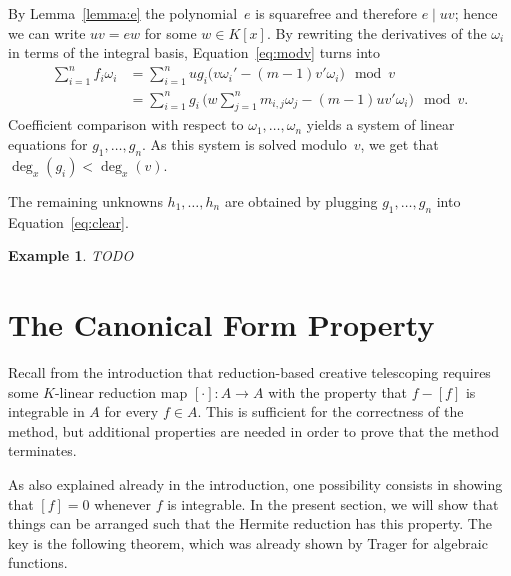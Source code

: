 \documentclass{sig-alternate}
\newtheorem{example}[theorem]{Example}
\begin{document}
By Lemma~\ref{lemma:e} the polynomial~$e$ is squarefree and therefore $e\mid uv$;
hence we can write $uv=ew$ for some $w\in K[x]$. By rewriting the
derivatives of the $\omega_i$ in terms of the integral basis,
Equation~\eqref{eq:modv} turns into
\begin{align*}
  \sum_{i=1}^n f_i\omega_i
  &= \sum_{i=1}^n ug_i \bigl( v\omega_i' - (m-1)v'\omega_i \bigr) \mod v\\
  &= \sum_{i=1}^n g_i\, \biggl( w\sum_{j=1}^n m_{i,j}\omega_j - (m-1)uv'\omega_i \biggr) \mod v.
\end{align*}
Coefficient comparison with respect to $\omega_1,\ldots,\omega_n$ yields a
system of linear equations for $g_1,\ldots,g_n$. As this system is solved modulo~$v$,
we get that $\deg_x(g_i)<\deg_x(v)$.

The remaining unknowns $h_1,\ldots,h_n$ are obtained by plugging
$g_1,\ldots,g_n$ into Equation~\eqref{eq:clear}.


\begin{example}
TODO
\end{example}

\section{The Canonical Form Property}

Recall from the introduction that reduction-based creative telescoping requires
some $K$-linear reduction map $[\cdot]\colon A\to A$ with the property that
$f-[f]$ is integrable in $A$ for every $f\in A$. This is sufficient for the
correctness of the method, but additional properties are needed in order to
prove that the method terminates.

As also explained already in the introduction, one possibility consists in
showing that $[f]=0$ whenever $f$ is integrable. In the present section,
we will show that things can be arranged such that the Hermite reduction
has this property. The key is the following theorem, which was already shown
by Trager for algebraic functions.
\end{document}

